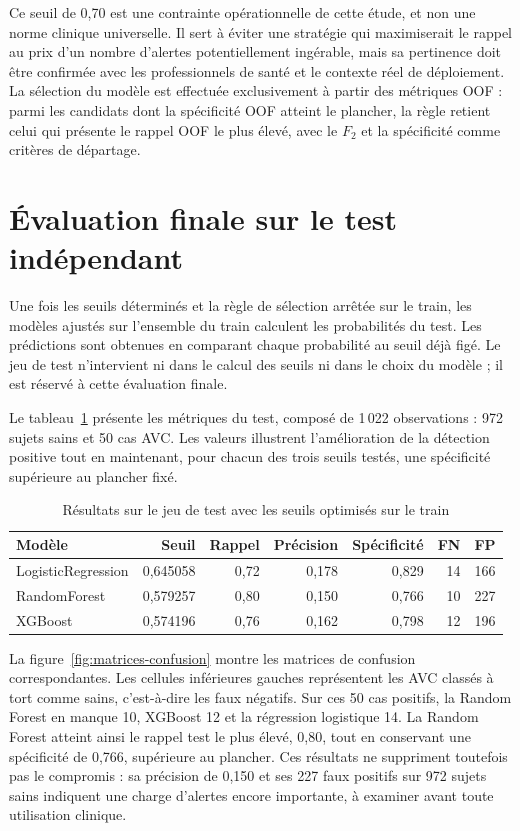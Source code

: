 Ce seuil de 0,70 est une contrainte opérationnelle de cette étude, et non une norme clinique universelle. Il sert à éviter une stratégie qui maximiserait le rappel au prix d'un nombre d'alertes potentiellement ingérable, mais sa pertinence doit être confirmée avec les professionnels de santé et le contexte réel de déploiement. La sélection du modèle est effectuée exclusivement à partir des métriques OOF : parmi les candidats dont la spécificité OOF atteint le plancher, la règle retient celui qui présente le rappel OOF le plus élevé, avec le \(F_2\) et la spécificité comme critères de départage.

\section{Évaluation finale sur le test indépendant}
Une fois les seuils déterminés et la règle de sélection arrêtée sur le train, les modèles ajustés sur l'ensemble du train calculent les probabilités du test. Les prédictions sont obtenues en comparant chaque probabilité au seuil déjà figé. Le jeu de test n'intervient ni dans le calcul des seuils ni dans le choix du modèle ; il est réservé à cette évaluation finale.

Le tableau~\ref{tab:resultats-test-seuils} présente les métriques du test, composé de 1\,022 observations : 972 sujets sains et 50 cas AVC. Les valeurs illustrent l'amélioration de la détection positive tout en maintenant, pour chacun des trois seuils testés, une spécificité supérieure au plancher fixé.

\begin{table}[H]
    \centering
    \caption{Résultats sur le jeu de test avec les seuils optimisés sur le train}
    \label{tab:resultats-test-seuils}
    \small
    \begin{tabular}{@{}lrrrrrr@{}}
        \toprule
        \textbf{Modèle} & \textbf{Seuil} & \textbf{Rappel} & \textbf{Précision} & \textbf{Spécificité} & \textbf{FN} & \textbf{FP}\\
        \midrule
        LogisticRegression & 0,645058 & 0,72 & 0,178 & 0,829 & 14 & 166\\
        RandomForest & 0,579257 & 0,80 & 0,150 & 0,766 & 10 & 227\\
        XGBoost & 0,574196 & 0,76 & 0,162 & 0,798 & 12 & 196\\
        \bottomrule
    \end{tabular}
\end{table}

La figure~\ref{fig:matrices-confusion} montre les matrices de confusion correspondantes. Les cellules inférieures gauches représentent les AVC classés à tort comme sains, c'est-à-dire les faux négatifs. Sur ces 50 cas positifs, la Random Forest en manque 10, XGBoost 12 et la régression logistique 14. La Random Forest atteint ainsi le rappel test le plus élevé, 0,80, tout en conservant une spécificité de 0,766, supérieure au plancher. Ces résultats ne suppriment toutefois pas le compromis : sa précision de 0,150 et ses 227 faux positifs sur 972 sujets sains indiquent une charge d'alertes encore importante, à examiner avant toute utilisation clinique.

